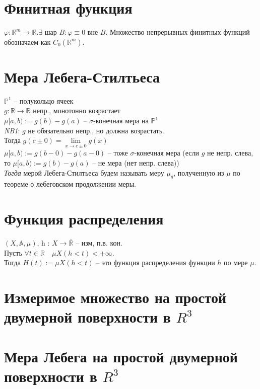 \documentclass[paper=a4, fontsize=17pt]{article}
\begin{document}
	\section{Финитная функция}
	$\varphi : \mathbb{R}^m \rightarrow \mathbb{R}. \exists $ шар $B: \varphi \equiv 0 $ вне $B$. Множество непрерывных финитных функций обозначаем как $C_0(\mathbb{R}^m)$. 
	
	\section{Мера Лебега-Стилтьеса}
	$\mathbb{P}^1$ -- полукольцо ячеек \\
	$g : \mathbb{R} \rightarrow \mathbb{R}$ непр., монотонно возрастает \\
	$\mu [a, b):=g(b) - g(a)$ -- $\sigma$-конечная мера на $\mathbb{P}^1$ \\
	
	\emph{NB1}: $g$ не обязательно непр., но должна возрастать. \\
	Тогда $g(c \pm 0)=\lim\limits_{x \rightarrow c \pm 0} g(x)$ \\ 
	$\mu [a, b):=g(b - 0) - g(a - 0)$ -- тоже $\sigma$-конечная мера (если $g$ не непр. слева, то $\mu [a, b):=g(b) - g(a)$ -- не мера (нет непр. слева)) \\
	
	
	\emph{Тогда} мерой Лебега-Стилтьеса будем называть меру $\mu_g$, полученную из $\mu$ по теореме о лебеговском продолжении меры.
	
	\section{Функция распределения}
	$(X, \mathds{A}, \mu) $, h : $X \rightarrow \overline{\mathbb{R}}$ -- изм, п.в. кон.\\
	
	Пусть $\forall t \in \mathbb{R}\quad \mu X(h < t) < +\infty$.\\
	Тогда $H(t):=\mu X(h < t)$ -- это функция распределения функции $h$ по мере $\mu$.
	
	\section{Измеримое множество на простой двумерной поверхности в $R^3$}
	
	\section{Мера Лебега на простой двумерной поверхности в $R^3$}
	
\end{document}
